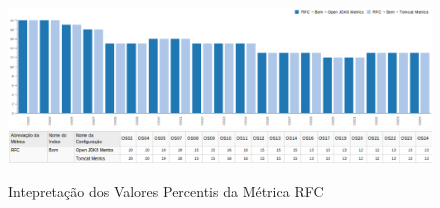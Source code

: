 \begin{apendicesenv}
\begin{figure}
\centering
\includegraphics[scale=0.70]{figuras/rfc-grafico.eps}
\includegraphics[scale=0.70]{figuras/rfc-tabela.eps}
\caption{Intepretação dos Valores Percentis da Métrica RFC}
\label{fig:metric-rfc}
\FloatBarrier
\end{figure}

\end{apendicesenv}
